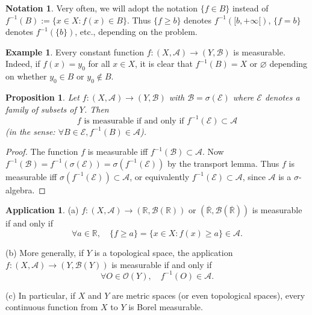\documentclass[11pt]{article}
\newtheorem{proposition}{Proposition}[section]
\theoremstyle{definition}
\newtheorem{example}{Example}[section]
\newtheorem{application}{Application}[section]
\newtheorem{notation}{Notation}[section]
\begin{document}
\begin{notation}
	Very often, we will adopt the notation $\{f\in B\}$ instead of $f^{-1}(B):=\{x\in X: f(x)\in B\}$. Thus $\{f\geq b\}$ denotes $f^{-1}([b,+\infty[)$, $\{f=b\}$ denotes $f^{-1}(\{b\})$, etc., depending on the problem.
\end{notation}

\begin{example}
	Every constant function $f:(X,\mathscr{A})\to (Y,\mathscr{B})$ is measurable. Indeed, if $f(x)=y_0$ for all $x\in X$, it is clear that $f^{-1}(B)=X$ or $\varnothing$ depending on whether $y_0\in B$ or $y_0\notin B$.
\end{example}

\begin{proposition}
Let $f:(X,\mathscr{A})\to (Y,\mathscr{B})$ with $\mathscr{B}=\sigma(\mathscr{E})$ where $\mathscr{E}$ denotes a family of subsets of $Y$. Then
\[
f \text{ is measurable if and only if } f^{-1}(\mathscr{E})\subset \mathscr{A}
\]
(in the sense: $\forall B\in \mathscr{E}, f^{-1}(B)\in\mathscr{A}$).
\end{proposition}

\begin{proof}
The function $f$ is measurable iff $f^{-1}(\mathscr{B})\subset \mathscr{A}$. Now $f^{-1}(\mathscr{B})=f^{-1}(\sigma(\mathscr{E}))=\sigma(f^{-1}(\mathscr{E}))$ by the transport lemma. Thus $f$ is measurable iff $\sigma(f^{-1}(\mathscr{E}))\subset \mathscr{A}$, or equivalently $f^{-1}(\mathscr{E})\subset \mathscr{A}$, since $\mathscr{A}$ is a $\sigma$-algebra.
\end{proof}

\begin{application}
(a) $f:(X,\mathscr{A})\to (\mathbb{R},\mathscr{B}(\mathbb{R}))$ or $(\overline{\mathbb{R}},\mathscr{B}(\overline{\mathbb{R}}))$ is measurable if and only if
\[
\forall a\in \mathbb{R}, \quad \{f\geq a\}=\{x\in X: f(x)\geq a\}\in\mathscr{A}.
\]

(b) More generally, if $Y$ is a topological space, the application $f:(X,\mathscr{A})\to (Y,\mathscr{B}(Y))$ is measurable if and only if
\[
\forall O\in \mathscr{O}(Y), \quad f^{-1}(O)\in \mathscr{A}.
\]

(c) In particular, if $X$ and $Y$ are metric spaces (or even topological spaces), every continuous function from $X$ to $Y$ is Borel measurable.
\end{application}
\end{document}
